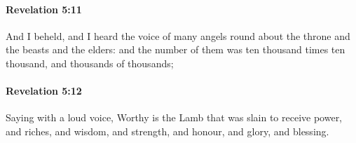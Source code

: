 		\paragraph{Revelation 5:11} %
			\label{REVELATIONNT-5-11}

			And I beheld, and I heard the voice of many angels round about the throne and the beasts and the elders: and the number of them was ten thousand times ten thousand, and thousands of thousands;

			\begin{framed}
			\scriptsize
				\begin{compactdesc}
					\item[SBLG] 
				\end{compactdesc}
			\end{framed}

		\paragraph{Revelation 5:12} %
			\label{REVELATIONNT-5-12}

			Saying with a loud voice, Worthy is the Lamb that was slain to receive power, and riches, and wisdom, and strength, and honour, and glory, and blessing.

